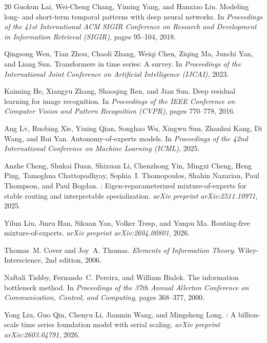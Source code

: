 \documentclass{article}
\begin{document}
\begin{thebibliography}{20}
Guokun Lai, Wei-Cheng Chang, Yiming Yang, and Hanxiao Liu.
\newblock Modeling long- and short-term temporal patterns with deep neural networks.
\newblock In \textit{Proceedings of the 41st International ACM SIGIR Conference on Research and Development in Information Retrieval (SIGIR)}, pages 95--104, 2018.

Qingsong Wen, Tian Zhou, Chaoli Zhang, Weiqi Chen, Ziqing Ma, Junchi Yan, and Liang Sun.
\newblock Transformers in time series: A survey.
\newblock In \textit{Proceedings of the International Joint Conference on Artificial Intelligence (IJCAI)}, 2023.

Kaiming He, Xiangyu Zhang, Shaoqing Ren, and Jian Sun.
\newblock Deep residual learning for image recognition.
\newblock In \textit{Proceedings of the IEEE Conference on Computer Vision and Pattern Recognition (CVPR)}, pages 770--778, 2016.

Ang Lv, Ruobing Xie, Yining Qian, Songhao Wu, Xingwu Sun, Zhanhui Kang, Di Wang, and Rui Yan.
\newblock Autonomy-of-experts models.
\newblock In \textit{Proceedings of the 42nd International Conference on Machine Learning (ICML)}, 2025.

Anzhe Cheng, Shukai Duan, Shixuan Li, Chenzhong Yin, Mingxi Cheng, Heng Ping, Tamoghna Chattopadhyay, Sophia~I. Thomopoulos, Shahin Nazarian, Paul Thompson, and Paul Bogdan.
: Eigen-reparameterized mixture-of-experts for stable routing and interpretable specialization.
\newblock \textit{arXiv preprint arXiv:2511.10971}, 2025.

Yilun Liu, Jinru Han, Sikuan Yan, Volker Tresp, and Yunpu Ma.
\newblock Routing-free mixture-of-experts.
\newblock \textit{arXiv preprint arXiv:2604.00801}, 2026.

Thomas~M. Cover and Joy~A. Thomas.
\newblock \textit{Elements of Information Theory}.
\newblock Wiley-Interscience, 2nd edition, 2006.

Naftali Tishby, Fernando~C. Pereira, and William Bialek.
\newblock The information bottleneck method.
\newblock In \textit{Proceedings of the 37th Annual Allerton Conference on Communication, Control, and Computing}, pages 368--377, 2000.

Yong Liu, Guo Qin, Chenyu Li, Jianmin Wang, and Mingsheng Long.
: A billion-scale time series foundation model with serial scaling.
\newblock \textit{arXiv preprint arXiv:2603.04791}, 2026.


\end{thebibliography}
\end{document}
